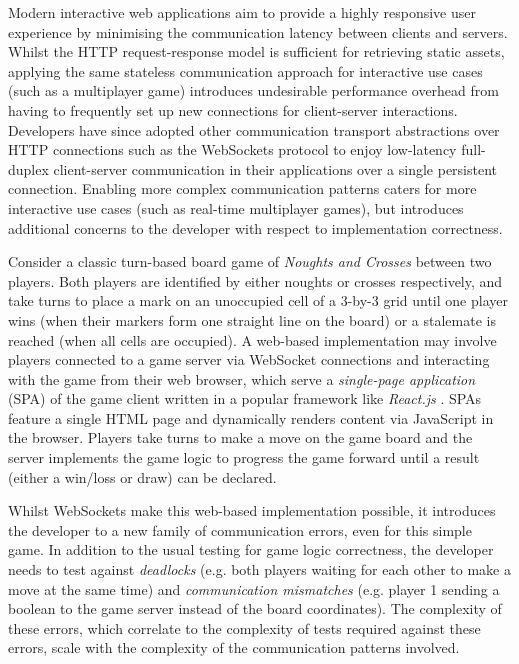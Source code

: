 \documentclass[submission,copyright,creativecommons]{eptcs}
\begin{document}
Modern interactive web applications aim to provide a highly responsive user experience by minimising the communication latency between clients and servers. 
Whilst the HTTP request-response model is sufficient for retrieving static assets, applying the same stateless communication approach for interactive use cases (such as a multiplayer game) introduces undesirable performance overhead from having to frequently set up new connections for client-server interactions. 
Developers have since adopted other communication transport abstractions over HTTP connections such as the WebSockets protocol \cite{WebSocketRFC} to enjoy low-latency full-duplex client-server communication in their applications over a single persistent connection. 
Enabling more complex communication patterns caters for more interactive use cases (such as real-time multiplayer games), but introduces additional concerns to the developer with respect to implementation correctness.

Consider a classic turn-based board game of \textit{Noughts and Crosses} between two players. Both players are identified by either noughts or crosses respectively, and take turns to place a mark on an unoccupied cell of a 3-by-3 grid until one player wins (when their markers form one straight line on the board) or a stalemate is reached (when all cells are occupied). A web-based implementation may involve players connected to a game server via WebSocket connections and interacting with the game from their web browser, which serve a \textit{single-page application} (SPA) of the game client written in a popular framework like \textit{React.js} \cite{React}. SPAs feature a single HTML page and dynamically renders content via JavaScript in the browser. Players take turns to make a move on the game board and the server implements the game logic to progress the game forward until a result (either a win/loss or draw) can be declared. 

Whilst WebSockets make this web-based implementation possible, it introduces the developer to a new family of communication errors, even for this simple game. In addition to the usual testing for game logic correctness, the developer needs to test against \textit{deadlocks} (e.g. both players waiting for each other to make a move at the same time) and \textit{communication mismatches} (e.g. player 1 sending a boolean to the game server instead of the board coordinates). The complexity of these errors, which correlate to the complexity of tests required against these errors, scale with the complexity of the communication patterns involved.
\end{document}
